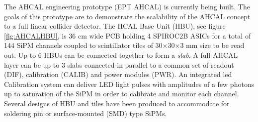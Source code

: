 The AHCAL engineering prototype (EPT AHCAL) \cite{Felix:ProtoAHCAL} is currently being built. The goals of this prototype are to demonstrate the scalability of the AHCAL concept to a full linear collider detector. The HCAL Base Unit (HBU), see figure \ref{fig:AHCALHBU}, is 36 cm wide PCB holding 4 SPIROC2B ASICs for a total of 144 SiPM channels coupled to scintillator tiles of 30$\times$30$\times$3 mm size to be read out. Up to 6 HBUs can be connected together to form a \textit{slab}. A full AHCAL layer can be up to 3 slabs connected in parallel to a common set of readout (DIF), calibration (CALIB) and power modules (PWR). An integrated \acrshort{led} Calibration system \cite{KVASNICKA2012402} can deliver LED light pulses with amplitudes of a few photons up to saturation of the SiPM in order to calibrate and monitor each channel. Several designs of HBU and tiles have been produced to accommodate for soldering pin or surface-mounted (SMD) type SiPMs.

